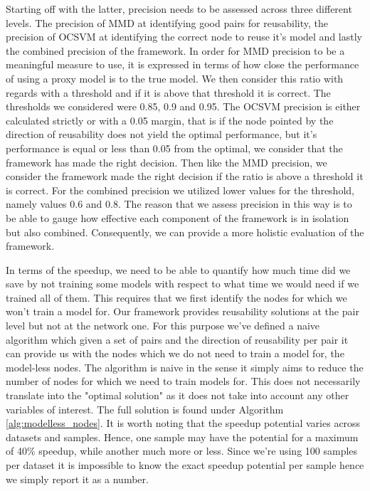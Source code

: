 \documentclass{mpaper}
\begin{document}
Starting off with the latter, precision needs to be assessed across three different levels. The precision of MMD at identifying good pairs for reusability, the precision of OCSVM at identifying the correct node to reuse it's model and lastly the combined precision of the framework. In order for MMD precision to be a meaningful measure to use, it is expressed in terms of how close the performance of using a proxy model is to the true model. We then consider this ratio with regards with a threshold and if it is above that threshold it is correct. The thresholds we considered were 0.85, 0.9 and 0.95. The OCSVM precision is either calculated strictly or with a 0.05 margin, that is if the node pointed by the direction of reusability does not yield the optimal performance, but it's performance is equal or less than 0.05 from the optimal, we consider that the framework has made the right decision. Then like the MMD precision, we consider the framework made the right decision if the ratio is above a threshold it is correct. For the combined precision we utilized lower values for the threshold, namely values 0.6 and 0.8. The reason that we assess precision in this way is to be able to gauge how effective each component of the framework is in isolation but also combined. Consequently, we can provide a more holistic evaluation of the framework. 

In terms of the speedup, we need to be able to quantify how much time did we save by not training some models with respect to what time we would need if we trained all of them. This requires that we first identify the nodes for which we won't train a model for. Our framework provides reusability solutions at the pair level but not at the network one. For this purpose we've defined a naive algorithm which given a set of pairs and the direction of reusability per pair it can provide us with the nodes which we do not need to train a model for, the model-less nodes. The algorithm is naive in the sense it simply aims to reduce the number of nodes for which we need to train models for. This does not necessarily translate into the "optimal solution" as it does not take into account any other variables of interest. The full solution is found under Algorithm \ref{alg:modelless_nodes}. It is worth noting that the speedup potential varies across datasets and samples. Hence, one sample may have the potential for a maximum of 40\% speedup, while another much more or less. Since we're using 100 samples per dataset it is impossible to know the exact speedup potential per sample hence we simply report it as a number. 
\end{document}

